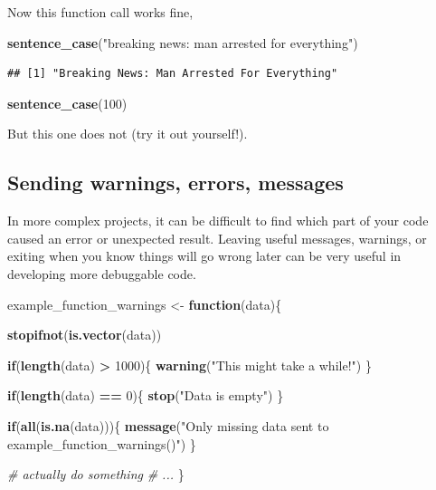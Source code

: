 \documentclass[]{book}
\newenvironment{Shaded}{\begin{snugshade}}{\end{snugshade}}
\newcommand{\CommentTok}[1]{\textcolor[rgb]{0.56,0.35,0.01}{\textit{#1}}}
\newcommand{\ControlFlowTok}[1]{\textcolor[rgb]{0.13,0.29,0.53}{\textbf{#1}}}
\newcommand{\DecValTok}[1]{\textcolor[rgb]{0.00,0.00,0.81}{#1}}
\newcommand{\KeywordTok}[1]{\textcolor[rgb]{0.13,0.29,0.53}{\textbf{#1}}}
\newcommand{\NormalTok}[1]{#1}
\newcommand{\OperatorTok}[1]{\textcolor[rgb]{0.81,0.36,0.00}{\textbf{#1}}}
\newcommand{\StringTok}[1]{\textcolor[rgb]{0.31,0.60,0.02}{#1}}
\begin{document}
Now this function call works fine,

\begin{Shaded}
\begin{Highlighting}[]
\KeywordTok{sentence_case}\NormalTok{(}\StringTok{"breaking news: man arrested for everything"}\NormalTok{)}
\end{Highlighting}
\end{Shaded}

\begin{verbatim}
## [1] "Breaking News: Man Arrested For Everything"
\end{verbatim}

\begin{Shaded}
\begin{Highlighting}[]
\KeywordTok{sentence_case}\NormalTok{(}\DecValTok{100}\NormalTok{)}
\end{Highlighting}
\end{Shaded}

But this one does not (try it out yourself!).

\hypertarget{sending-warnings-errors-messages}{%
\subsection{Sending warnings, errors, messages}\label{sending-warnings-errors-messages}}

In more complex projects, it can be difficult to find which part of your code caused an error or unexpected result. Leaving useful messages, warnings, or exiting when you know things will go wrong later can be very useful in developing more debuggable code.

\begin{Shaded}
\begin{Highlighting}[]
\NormalTok{example_function_warnings <-}\StringTok{ }\ControlFlowTok{function}\NormalTok{(data)\{}
  
  \KeywordTok{stopifnot}\NormalTok{(}\KeywordTok{is.vector}\NormalTok{(data))}
  
  \ControlFlowTok{if}\NormalTok{(}\KeywordTok{length}\NormalTok{(data) }\OperatorTok{>}\StringTok{ }\DecValTok{1000}\NormalTok{)\{}
    \KeywordTok{warning}\NormalTok{(}\StringTok{"This might take a while!"}\NormalTok{)}
\NormalTok{  \}}
  
  \ControlFlowTok{if}\NormalTok{(}\KeywordTok{length}\NormalTok{(data) }\OperatorTok{==}\StringTok{ }\DecValTok{0}\NormalTok{)\{}
    \KeywordTok{stop}\NormalTok{(}\StringTok{"Data is empty"}\NormalTok{)}
\NormalTok{  \}}
  
  \ControlFlowTok{if}\NormalTok{(}\KeywordTok{all}\NormalTok{(}\KeywordTok{is.na}\NormalTok{(data)))\{}
    \KeywordTok{message}\NormalTok{(}\StringTok{"Only missing data sent to example_function_warnings()"}\NormalTok{)}
\NormalTok{  \}}
  
  \CommentTok{# actually do something}
  \CommentTok{# ...}
\NormalTok{\}}
\end{Highlighting}
\end{Shaded}
\end{document}
